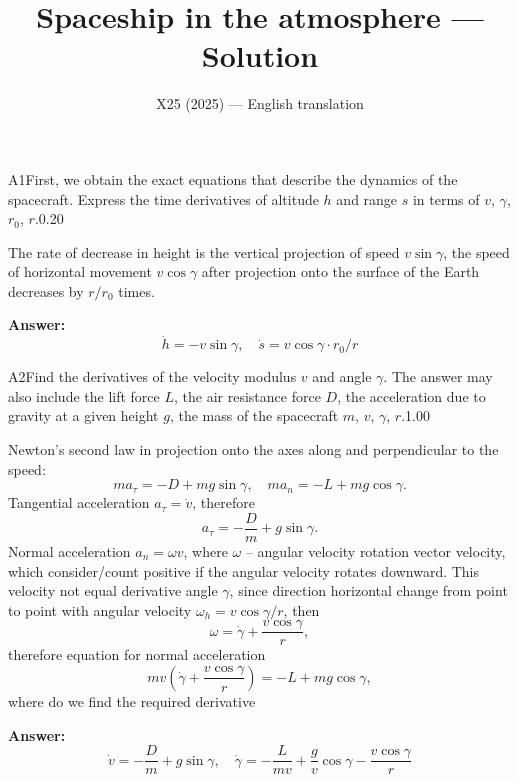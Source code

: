 \documentclass[11pt,a4paper]{article}
\title{\textbf{Spaceship in the atmosphere --- Solution}}
\author{\normalsize X25 (2025) — English translation}
\date{}
\begin{document}
\maketitle\vspace{-0.5em}
\begin{solcard}{A1}{First, we obtain the exact equations that describe the dynamics of the spacecraft. Express the time derivatives of altitude $h$ and range $s$ in terms of $v$, $\gamma$, $r_0$, $r$.}{0.20}

The rate of decrease in height is the vertical projection of speed $v \sin \gamma$, the speed of horizontal movement $v \cos \gamma$ after projection onto the surface of the Earth decreases by $r/r_0$ times.

\par\smallskip\noindent\textbf{Answer:} $$\dot h=-v \sin{\gamma}, \quad\dot s= v\cos{\gamma}\cdot r_0/r$$
\end{solcard}

\begin{solcard}{A2}{Find the derivatives of the velocity modulus $v$ and angle $\gamma$. The answer may also include the lift force $L$, the air resistance force $D$, the acceleration due to gravity at a given height $g$, the mass of the spacecraft $m$, $v$, $\gamma$, $r$.}{1.00}

Newton's second law in projection onto the axes along and perpendicular to the speed: $$ma_\tau=-D+mg\sin{\gamma}, \quad ma_n=-L+mg\cos{\gamma}.$$Tangential acceleration  $a_\tau=\dot v$, therefore $$ a_\tau = - \frac{D}{m} + g \sin\gamma. $$Normal acceleration $a_n = \omega v $, where $\omega$ – angular velocity rotation vector velocity, which consider/count positive if the angular velocity rotates downward.  This velocity not equal derivative angle $\gamma$, since direction horizontal change from point to point with angular velocity $\omega_h = v \cos \gamma/r$, then $$ \omega = \dot{\gamma} + \frac{v \cos \gamma}{r}, $$therefore equation for normal acceleration $$ mv \left (\dot{\gamma} + \frac{v \cos \gamma}{r}\right) = - L + mg \cos \gamma, $$where do we find the required derivative

\par\smallskip\noindent\textbf{Answer:} $$\dot v= -\frac{D}{m}+g\sin{\gamma}, \quad \dot\gamma=-\frac{L}{mv}+\frac{g}{v}\cos{\gamma}-\frac{v\cos{\gamma}}{r}$$
\end{solcard}
\end{document}
